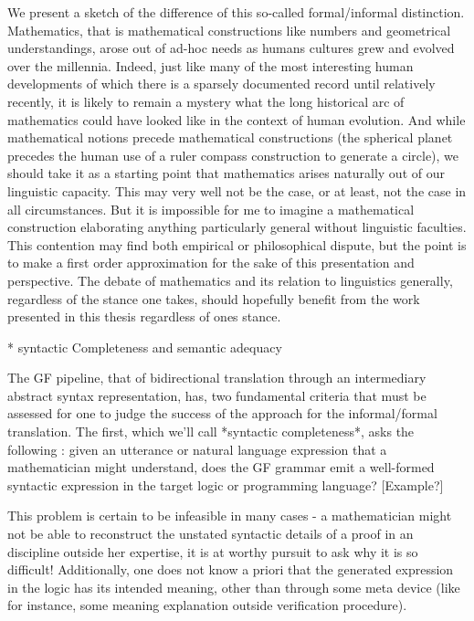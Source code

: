\documentclass[11pt, a4paper]{article}
\begin{document}
We present a sketch of the difference of this so-called formal/informal
distinction. Mathematics, that is mathematical constructions like numbers and
geometrical understandings, arose out of ad-hoc needs as humans cultures grew
and evolved over the millennia. Indeed, just like many of the most interesting
human developments of which there is a sparsely documented record until
relatively recently, it is likely to remain a mystery what the long historical
arc of mathematics could have looked like in the context of human evolution. And
while mathematical notions precede mathematical constructions (the spherical
planet precedes the human use of a ruler compass construction to generate a
circle), we should take it as a starting point that mathematics arises naturally
out of our linguistic capacity. This may very well not be the case, or at least,
not the case in all circumstances. But it is impossible for me to imagine a
mathematical construction elaborating anything particularly general without
linguistic faculties. This contention may find both empirical or philosophical
dispute, but the point is to make a first order approximation for the sake of
this presentation and perspective. The debate of mathematics and its relation to
linguistics generally, regardless of the stance one takes, should hopefully
benefit from the work presented in this thesis regardless of ones stance.

  * syntactic Completeness and semantic adequacy

The GF pipeline, that of bidirectional translation through an intermediary
abstract syntax representation, has, two fundamental criteria that must be
assessed for one to judge the success of the approach for the informal/formal
translation. The first, which we'll call *syntactic completeness*, asks the
following : given an utterance or natural language expression that a
mathematician might understand, does the GF grammar emit a well-formed syntactic
expression in the target logic or programming language? [Example?]

This problem is certain to be infeasible in many cases - a mathematician might
not be able to reconstruct the unstated syntactic details of a proof in an
discipline outside her expertise, it is at worthy pursuit to ask why it is so
difficult! Additionally, one does not know a priori that the generated
expression in the logic has its intended meaning, other than through some meta
device (like for instance, some meaning explanation outside verification
procedure).
\end{document}
